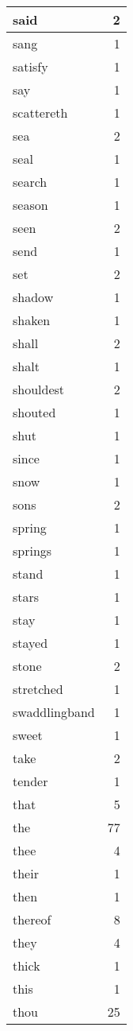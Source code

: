 \begin{center}
\begin{longtable}{l|r}
said & 2 \\ \hline
sang & 1 \\ \hline
satisfy & 1 \\ \hline
say & 1 \\ \hline
scattereth & 1 \\ \hline
sea & 2 \\ \hline
seal & 1 \\ \hline
search & 1 \\ \hline
season & 1 \\ \hline
seen & 2 \\ \hline
send & 1 \\ \hline
set & 2 \\ \hline
shadow & 1 \\ \hline
shaken & 1 \\ \hline
shall & 2 \\ \hline
shalt & 1 \\ \hline
shouldest & 2 \\ \hline
shouted & 1 \\ \hline
shut & 1 \\ \hline
since & 1 \\ \hline
snow & 1 \\ \hline
sons & 2 \\ \hline
spring & 1 \\ \hline
springs & 1 \\ \hline
stand & 1 \\ \hline
stars & 1 \\ \hline
stay & 1 \\ \hline
stayed & 1 \\ \hline
stone & 2 \\ \hline
stretched & 1 \\ \hline
swaddlingband & 1 \\ \hline
sweet & 1 \\ \hline
take & 2 \\ \hline
tender & 1 \\ \hline
that & 5 \\ \hline
the & 77 \\ \hline
thee & 4 \\ \hline
their & 1 \\ \hline
then & 1 \\ \hline
thereof & 8 \\ \hline
they & 4 \\ \hline
thick & 1 \\ \hline
this & 1 \\ \hline
thou & 25 \\ \hline

\end{longtable}
\end{center}
